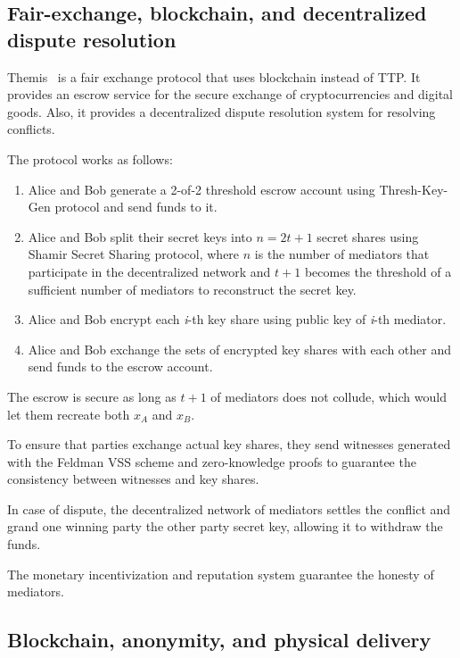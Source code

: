\documentclass[pdftex,twocolumn,epjc3]{svjour3}
\begin{document}
\subsection{Fair-exchange, blockchain, and decentralized dispute resolution}
\label{themis-towards-decentralized-escrow-of-cryptocurrencies-without-trusted-third-parties}

Themis~\cite{mengThemisDecentralizedEscrow2019} is a fair exchange protocol that uses blockchain instead of TTP. It provides an escrow service for the secure exchange of cryptocurrencies and digital goods. Also, it provides a decentralized dispute resolution system for resolving conflicts.

The protocol works as follows:
\begin{enumerate}
    \item Alice and Bob generate a 2-of-2 threshold escrow account using Thresh-Key-Gen protocol and send funds to it.
    \item Alice and Bob split their secret keys into \(n=2t+1\) secret shares using Shamir Secret Sharing protocol, where \(n\) is the number of mediators that participate in the decentralized network and \(t+1\) becomes the threshold of a sufficient number of mediators to reconstruct the secret key.
    \item Alice and Bob encrypt each \textit{i}-th key share using public key of \textit{i}-th mediator.
    \item Alice and Bob exchange the sets of encrypted key shares with each other and send funds to the escrow account.
\end{enumerate}

The escrow is secure as long as \(t+1\) of mediators does not collude, which would let them recreate both \(x_A\) and \(x_B\). 

To ensure that parties exchange actual key shares, they send witnesses generated with the Feldman VSS scheme and zero-knowledge proofs to guarantee the consistency between witnesses and key shares.

In case of dispute, the decentralized network of mediators settles the conflict and grand one winning party the other party secret key, allowing it to withdraw the funds.

The monetary incentivization and reputation system guarantee the honesty of mediators.

\subsection{Blockchain, anonymity, and physical delivery}\label{lelantos-a-blockchain-based-anonymous-physical-delivery-system}
\end{document}
